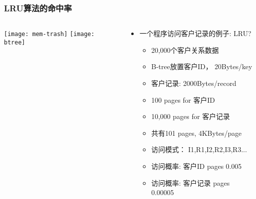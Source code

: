 \begin{frame}[plain]
	\frametitle{LRU算法的命中率}
	\begin{columns}
		\begin{column}{.5\textwidth}
			\centering
			\texttt{[image: mem-trash]}
			\texttt{[image: btree]}
		\end{column}
		
		\begin{column}{.5\textwidth}
			
			\begin{itemize}
				\item 一个程序访问客户记录的例子: LRU?
				\begin{itemize}
					
					\item 20,000个客户关系数据
					\item B-tree放置客户ID， 20Bytes/key
					\item 客户记录: 2000Bytes/record
					\item 100 pages for 客户ID
					\item 10,000 pages for 客户记录
					\item 共有101 pages, 4KBytes/page
					\item 访问模式： I1,R1,I2,R2,I3,R3...
					\item 访问概率: 客户ID pages 0.005
					\item 访问概率: 客户记录 pages 0.00005
				\end{itemize}
			\end{itemize}


		\end{column}
		
		
	\end{columns}
\end{frame}




